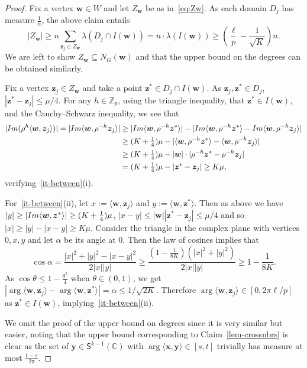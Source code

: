 \documentclass[10pt,a4paper]{article}
\newcommand\innerp[1]{\langle #1 \rangle}
\newcommand{\V}[1]{\mathbold{#1}}
\theoremstyle{definition}
\newcommand{\iminnerp}[1]{{\rm{Im}}\langle #1 \rangle}
\newcommand{\im}[1]{{\rm{Im}}(#1)}
\newcommand{\sS}{\mathsf{S}}
\newcommand{\sZ}{\mathbb{Z}}
\begin{document}
\begin{proof}
	Fix a vertex $\V{w}\in W$ and let $Z_{\V w}$ be as in~\eqref{eq:Zw}. As each domain $D_j$ has measure $\frac{1}{n}$, the above claim entails
	\begin{equation*}
		|Z_\V{w}|\ge n\sum_{\V{z}_{j}\in Z_\V{w}}\lambda(D_j\cap I(\V{w}))=n\cdot\lambda(I(\V{w}))\ge \left(\frac{\ell}{p}-\frac{1}{\sqrt{K}}\right)n.
	\end{equation*}  
    We are left to show $Z_{\V w}\subseteq N_G(\V w)$ and that the upper bound on the degrees can be obtained similarly.
	
	Fix a vertex $\V{z}_j\in Z_\V{w}$ and take a point $\V{z}^*\in D_j\cap I(\V{w})$. As $\V z_j,\V z^*\in D_j$, $|\V{z}^*-\V{z}_j|\le \mu/4$. For any $h\in \sZ_p$, using the triangle inequality, that $\V z^*\in I(\V{w})$, and the Cauchy–Schwarz inequality, we see that
	\begin{align*}
		|\im{\rho^h \innerp{\V{w},\V{z}_j}}|=|\iminnerp{\V{w},\rho^{-h}\V{z}_j}|&\ge |\iminnerp{\V{w},\rho^{-h}\V{z}^*}|-|\iminnerp{\V{w},\rho^{-h}\V{z}^*}-\iminnerp{\V{w},\rho^{-h}\V{z}_j}|\\
		&\ge (K+\tfrac{1}{4})\mu-|\innerp{\V{w},\rho^{-h}\V{z}^*}-\innerp{\V{w},\rho^{-h}\V{z}_j}|\\
		&\ge(K+\tfrac{1}{4})\mu-|\V{w}|\cdot|\rho^{-h}\V{z}^*-\rho^{-h}\V{z}_{j}|\\
		&=(K+\tfrac{1}{4})\mu-|\V{z}^*-\V{z}_{j}|\ge K\mu,
	\end{align*}  
	verifying~\ref{it-between}(i). 
	
	For~\ref{it-between}(ii), let $x:=\innerp{\V{w},\V{z}_j}$ and $y:=\innerp{\V{w},\V{z}^*}$. Then as above we have $|y|\ge |\iminnerp{\V{w},\V{z}^*}|\ge (K+\frac{1}{4})\mu$, $|x-y|\le |\V w||\V z^*-\V z_j|\le \mu/4$ and so $|x|\ge |y|-|x-y|\ge K\mu$.
	Consider the triangle in the complex plane with vertices $0,x,y$ and let $\alpha$ be its angle at $0$. Then the law of cosines implies that
	$$\cos\alpha=\frac{|x|^2+|y|^2-|x-y|^2}{2|x||y|}\ge\frac{(1-\frac{1}{8K})(|x|^2+|y|^2)}{2|x||y|}\ge 1-\frac{1}{8K}.$$
	As $\cos \theta\le 1-\frac{\theta^2}{4}$ when $\theta\in(0,1)$, we get $|\arg\innerp{\V{w},\V{z}_j} - \arg\innerp{\V{w},\V{z}^*}|=\alpha\le 1/\sqrt{2K}$. Therefore $\arg\innerp{\V{w},\V{z}_j}\in [0,2\pi\ell/p]$ as $\V z^*\in I(\V w)$, implying~\ref{it-between}(ii).
	
	We omit the proof of the upper bound on degrees since it is very similar but easier, noting that the upper bound corresponding to Claim~\ref{lem-crossnbrs} is clear as the set of $\V{y} \in \sS^{k-1}(\mathbb{C})$ with $\arg\innerp{\V{x},\V{y}} \in [s,t]$ trivially has measure at most $\frac{t-s}{2\pi}$.
\end{proof}
\end{document}
